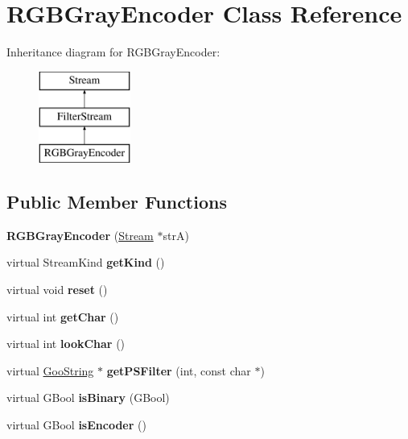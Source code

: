 \hypertarget{class_r_g_b_gray_encoder}{}\section{R\+G\+B\+Gray\+Encoder Class Reference}
\label{class_r_g_b_gray_encoder}
Inheritance diagram for R\+G\+B\+Gray\+Encoder\+:\begin{figure}[H]
\begin{center}
\leavevmode
\includegraphics[height=3.000000cm]{class_r_g_b_gray_encoder}
\end{center}
\end{figure}
\subsection*{Public Member Functions}
\begin{DoxyCompactItemize}
\item 
\mbox{\label{class_r_g_b_gray_encoder_ae103d0e432320c6df31e816ef0a6924b}} 
{\bfseries R\+G\+B\+Gray\+Encoder} (\hyperlink{class_stream}{Stream} $\ast$strA)
\item 
\mbox{\label{class_r_g_b_gray_encoder_ab055b4764dda978ff8b9564b0d36d946}} 
virtual Stream\+Kind {\bfseries get\+Kind} ()
\item 
\mbox{\label{class_r_g_b_gray_encoder_af16aa77c36d8f994f10ed473dfd37486}} 
virtual void {\bfseries reset} ()
\item 
\mbox{\label{class_r_g_b_gray_encoder_aa6214a356ab7ca53f21b725b65530221}} 
virtual int {\bfseries get\+Char} ()
\item 
\mbox{\label{class_r_g_b_gray_encoder_a22d715fda7b9b2a1dddf722568053ae7}} 
virtual int {\bfseries look\+Char} ()
\item 
\mbox{\label{class_r_g_b_gray_encoder_ac98a242735ea77b14755af1ffae28ef3}} 
virtual \hyperlink{class_goo_string}{Goo\+String} $\ast$ {\bfseries get\+P\+S\+Filter} (int, const char $\ast$)
\item 
\mbox{\label{class_r_g_b_gray_encoder_acc1279f5fa3f30d6a5ca9e79b5f88a68}} 
virtual G\+Bool {\bfseries is\+Binary} (G\+Bool)
\item 
\mbox{\label{class_r_g_b_gray_encoder_ad7da1c2384bac25c592084df9e5d93a8}} 
virtual G\+Bool {\bfseries is\+Encoder} ()
\end{DoxyCompactItemize}
